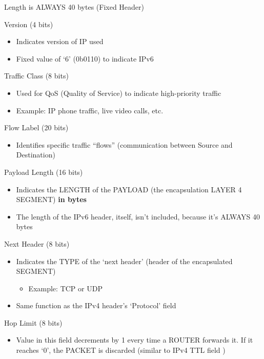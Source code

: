 Length is ALWAYS 40 bytes (Fixed Header)

Version (4 bits)

\begin{itemize}
\tightlist
\item
  Indicates version of IP used
\item
  Fixed value of `6' (0b0110) to indicate IPv6
\end{itemize}

Traffic Class (8 bits)

\begin{itemize}
\tightlist
\item
  Used for QoS (Quality of Service) to indicate high-priority traffic
\item
  Example: IP phone traffic, live video calls, etc.
\end{itemize}

Flow Label (20 bits)

\begin{itemize}
\tightlist
\item
  Identifies specific traffic ``flows'' (communication between Source
  and Destination)
\end{itemize}

Payload Length (16 bits)

\begin{itemize}
\tightlist
\item
  Indicates the LENGTH of the PAYLOAD (the encapsulation LAYER 4
  SEGMENT) \textbf{in bytes}
\item
  The length of the IPv6 header, itself, isn't included, because it's
  ALWAYS 40 bytes
\end{itemize}

Next Header (8 bits)

\begin{itemize}
\tightlist
\item
  Indicates the TYPE of the `next header' (header of the encapsulated
  SEGMENT)

  \begin{itemize}
  \tightlist
  \item
    Example: TCP or UDP
  \end{itemize}
\item
  Same function as the IPv4 header's `Protocol' field
\end{itemize}

Hop Limit (8 bits)

\begin{itemize}
\tightlist
\item
  Value in this field decrements by 1 every time a ROUTER forwards it.
  If it reaches `0', the PACKET is discarded (similar to IPv4 TTL field
  )
\end{itemize}

